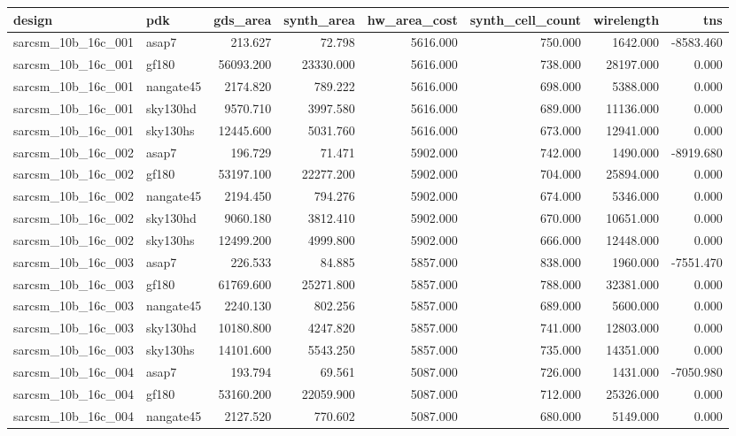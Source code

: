 \begin{tabular}{llrrrrrr}
\toprule
design & pdk & gds\_area & synth\_area & hw\_area\_cost & synth\_cell\_count & wirelength & tns \\
\midrule
sarcsm\_10b\_16c\_001 & asap7 & 213.627 & 72.798 & 5616.000 & 750.000 & 1642.000 & -8583.460 \\
sarcsm\_10b\_16c\_001 & gf180 & 56093.200 & 23330.000 & 5616.000 & 738.000 & 28197.000 & 0.000 \\
sarcsm\_10b\_16c\_001 & nangate45 & 2174.820 & 789.222 & 5616.000 & 698.000 & 5388.000 & 0.000 \\
sarcsm\_10b\_16c\_001 & sky130hd & 9570.710 & 3997.580 & 5616.000 & 689.000 & 11136.000 & 0.000 \\
sarcsm\_10b\_16c\_001 & sky130hs & 12445.600 & 5031.760 & 5616.000 & 673.000 & 12941.000 & 0.000 \\
sarcsm\_10b\_16c\_002 & asap7 & 196.729 & 71.471 & 5902.000 & 742.000 & 1490.000 & -8919.680 \\
sarcsm\_10b\_16c\_002 & gf180 & 53197.100 & 22277.200 & 5902.000 & 704.000 & 25894.000 & 0.000 \\
sarcsm\_10b\_16c\_002 & nangate45 & 2194.450 & 794.276 & 5902.000 & 674.000 & 5346.000 & 0.000 \\
sarcsm\_10b\_16c\_002 & sky130hd & 9060.180 & 3812.410 & 5902.000 & 670.000 & 10651.000 & 0.000 \\
sarcsm\_10b\_16c\_002 & sky130hs & 12499.200 & 4999.800 & 5902.000 & 666.000 & 12448.000 & 0.000 \\
sarcsm\_10b\_16c\_003 & asap7 & 226.533 & 84.885 & 5857.000 & 838.000 & 1960.000 & -7551.470 \\
sarcsm\_10b\_16c\_003 & gf180 & 61769.600 & 25271.800 & 5857.000 & 788.000 & 32381.000 & 0.000 \\
sarcsm\_10b\_16c\_003 & nangate45 & 2240.130 & 802.256 & 5857.000 & 689.000 & 5600.000 & 0.000 \\
sarcsm\_10b\_16c\_003 & sky130hd & 10180.800 & 4247.820 & 5857.000 & 741.000 & 12803.000 & 0.000 \\
sarcsm\_10b\_16c\_003 & sky130hs & 14101.600 & 5543.250 & 5857.000 & 735.000 & 14351.000 & 0.000 \\
sarcsm\_10b\_16c\_004 & asap7 & 193.794 & 69.561 & 5087.000 & 726.000 & 1431.000 & -7050.980 \\
sarcsm\_10b\_16c\_004 & gf180 & 53160.200 & 22059.900 & 5087.000 & 712.000 & 25326.000 & 0.000 \\
sarcsm\_10b\_16c\_004 & nangate45 & 2127.520 & 770.602 & 5087.000 & 680.000 & 5149.000 & 0.000 \\

\end{tabular}
